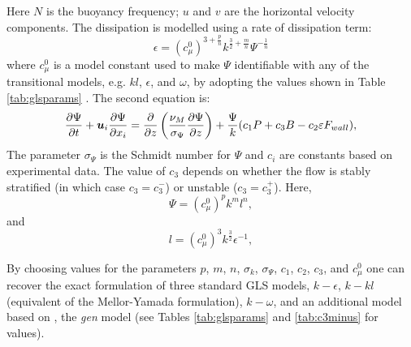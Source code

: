 Here $N$ is the buoyancy frequency; $u$ and $v$ are the horizontal velocity 
components. The dissipation is modelled using a rate of dissipation term:
\begin{equation}
\epsilon=\left(c_\mu^0\right)^{3+\frac{p}{n}}k^{\frac{3}{2}+\frac{m}{n}}\Psi^{-\frac{1}{n}}
\end{equation}
where $c_\mu^0$ is a model constant used to make $\Psi$ identifiable with any of the transitional
models, e.g. $kl$, $\epsilon$, and $\omega$, by adopting the values shown in Table \ref{tab:glsparams} \citep{umlauf2003}.
The second equation is:
\begin{equation}
\frac{\partial \Psi}{\partial t} + {\mbox{\boldmath$u$}}_i\frac{\partial \Psi}{\partial x_i} =
\frac{\partial}{\partial z}\left(\frac{\nu_M}{\sigma_\Psi}\frac{\partial \Psi}{\partial z}\right) +
\frac{\Psi}{k}(c_1P + c_3B - c_2\varepsilon F_{wall}),
\label{eq:psi_one}
\end{equation}
\noindent
The parameter $\sigma_\Psi$ is the Schmidt number for $\Psi$ and $c_i$ are
constants based on experimental data. The value of $c_3$ depends on whether the flow
is stably stratified (in which case $c_3=c_3^-$) or unstable ($c_3=c_3^+$).
Here,
\begin{equation}
\Psi=\left(c_\mu^0\right)^pk^ml^n,
\label{eq:psi}
\end{equation}
and
\begin{equation}
l=\left(c_\mu^0\right)^3k^{\frac{3}{2}}\epsilon^{-1},
\end{equation}

By choosing values for the parameters $p$, $m$, $n$, $\sigma_k$, $\sigma_\Psi$,
$c_1$, $c_2$, $c_3$, and $c_\mu^0$ one can recover the
exact formulation of three standard GLS models, $k-\epsilon$, $k-kl$ (equivalent of the Mellor-Yamada formulation),
$k-\omega$, and an additional model based on \citet{umlauf2003}, the \emph{gen}
model (see Tables \ref{tab:glsparams} and \ref{tab:c3minus} for values).

